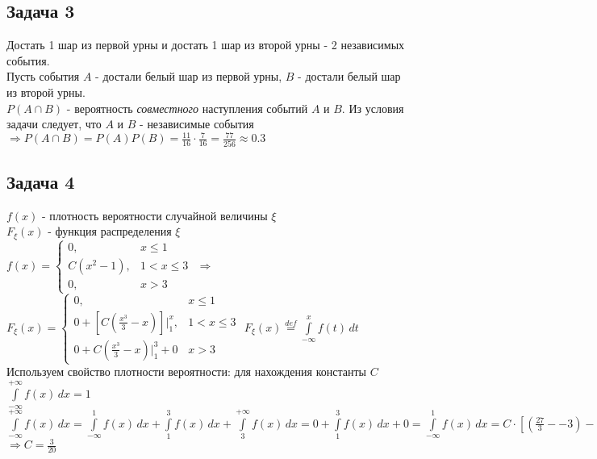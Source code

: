 \documentclass[12pt]{article}
\begin{document}
			\subsection*{Задача 3}
			Достать 1 шар из первой урны и достать 1 шар из второй урны - 2 независимых события.\\
			Пусть события $A$ - достали белый шар из первой урны, $B$ - достали белый шар из второй урны.\\
			$P(A\cap B)$ - вероятность \textit{совместного} наступления событий $A$ и $B$. Из условия задачи следует, что $A$ и $B$ - независимые события $\Rightarrow P(A\cap B) = P(A)P(B) = \frac{11}{16} \cdot \frac{7}{16} = \frac{77}{256} \approx 0.3$\\    	
			
			\subsection*{Задача 4}
			$f(x)$ - плотность вероятности случайной величины $\xi$\\
			$F_{\xi}(x)$ - функция распределения $\xi$\\
			$
			f(x) =
			\begin{cases}
				0, & x \leq 1 \\
				C(x^{2} - 1), & 1 < x \leq 3 \\
				0, & x > 3 
			\end{cases}
			$
			$\Longrightarrow$	
			$
			F_{\xi}(x) =
			\begin{cases}
			0, & x \leq 1 \\
			0 + [C(\frac{x^{3}}{3} - x)]\bigg|_{1}^{x}, & 1 < x \leq 3\\
			0 + C(\frac{x^{3}}{3} - x)\bigg|_{1}^{3} + 0 & x > 3
			\end{cases}
			$	
			\newline
			$F_{\xi}(x) \stackrel{def}{=} \int\limits_{-\infty}^{x}f(t)\,dt$\\
			Используем свойство плотности вероятности: для нахождения константы $C$\\
			$\int\limits_{-\infty}^{+\infty}f(x)\,dx = 1$\\
			$\int\limits_{-\infty}^{+\infty}f(x)\,dx = \int\limits_{-\infty}^{1}f(x)\,dx + \int\limits_{1}^{3}f(x)\,dx + \int\limits_{3}^{+\infty}f(x)\,dx = 0 + \int\limits_{1}^{3}f(x)\,dx + 0 = \int\limits_{-\infty}^{1}f(x)\,dx = C\cdot[(\frac{27}{3} -- 3) - (\frac{1}{3} - 1)] = C(6 + \frac{2}{3}) = C\cdot\frac{20}{3} = 1$
			$\Rightarrow C = \frac{3}{20}$ \\
\end{document}
